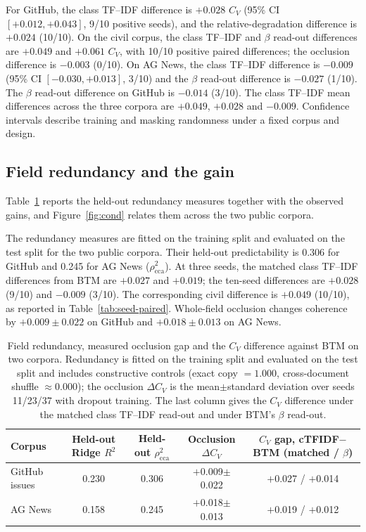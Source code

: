 \documentclass[pdflatex,sn-basic]{sn-jnl}
\begin{document}
For GitHub, the class TF--IDF difference is $+0.028$ $C_V$ (95\% CI $[+0.012,+0.043]$, 9/10
positive seeds), and the relative-degradation difference is $+0.024$ (10/10). On the civil
corpus, the class TF--IDF and $\beta$ read-out differences are $+0.049$ and $+0.061$ $C_V$, with
10/10 positive paired differences; the occlusion difference is $-0.003$ (0/10). On AG News, the
class TF--IDF difference is $-0.009$ (95\% CI $[-0.030,+0.013]$, 3/10) and the $\beta$ read-out
difference is $-0.027$ (1/10). The $\beta$ read-out difference on GitHub is $-0.014$ (3/10). The
class TF--IDF mean differences across the three corpora are $+0.049$, $+0.028$ and $-0.009$.
Confidence intervals describe training and masking randomness under a fixed corpus and design.

\subsection{Field redundancy and the gain}
Table~\ref{tab:conditional} reports the held-out redundancy measures together with the observed gains, and Figure~\ref{fig:cond} relates them across the two public corpora.

The redundancy measures are fitted on the training split and evaluated on the test split for the
two public corpora. Their held-out predictability is 0.306 for GitHub and 0.245 for AG News
($\rho^2_{\mathrm{cca}}$). At three seeds, the matched class TF--IDF differences from BTM are
$+0.027$ and $+0.019$; the ten-seed differences are $+0.028$ (9/10) and $-0.009$ (3/10). The
corresponding civil difference is $+0.049$ (10/10), as reported in Table~\ref{tab:seed-paired}.
Whole-field occlusion changes coherence by $+0.009\pm0.022$ on GitHub and $+0.018\pm0.013$ on
AG News.

\begin{table}[t]
\centering
\caption{Field redundancy, measured occlusion gap and the $C_V$ difference against BTM on two corpora. Redundancy is fitted on the training split and evaluated on the test split and includes constructive controls (exact copy $=1.000$, cross-document shuffle $\approx0.000$); the occlusion $\Delta C_V$ is the mean$\pm$standard deviation over seeds 11/23/37 with dropout training. The last column gives the $C_V$ difference under the matched class TF--IDF read-out and under BTM's $\beta$ read-out.}
\label{tab:conditional}
\footnotesize
\setlength{\tabcolsep}{4pt}
\begin{tabular}{@{}lcccc@{}}
\toprule
Corpus & Held-out Ridge $R^2$ & Held-out $\rho^2_{\mathrm{cca}}$
 & Occlusion $\Delta C_V$ & $C_V$ gap, cTFIDF$-$BTM (matched / $\beta$) \\
\midrule
GitHub issues & 0.230 & 0.306 & $+$0.009$\pm$0.022 & $+$0.027 / $+$0.014 \\
AG News & 0.158 & 0.245 & $+$0.018$\pm$0.013 & $+$0.019 / $+$0.012 \\
\bottomrule
\end{tabular}
\end{table}
\end{document}
